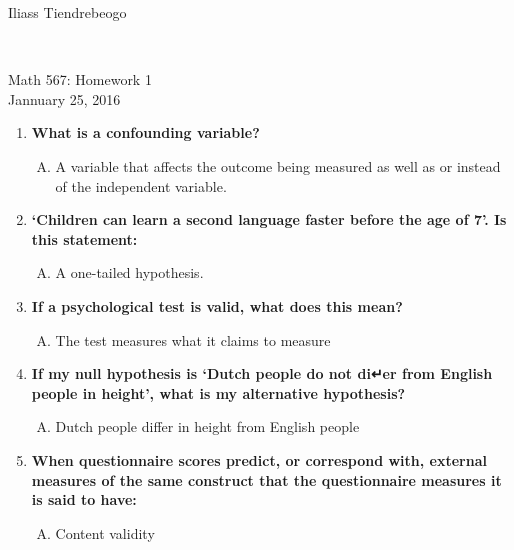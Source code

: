 \documentclass{article}[14pt]
\begin{document}
\hfill Iliass Tiendrebeogo\\

\hfill \date{Jannuary 25, 2016} \\

\bigskip

\begin{center}
  \begin{Large}
    Math 567: Homework 1\\
    Jannuary 25, 2016\\
   
  \end{Large}
\end{center} 


\begin{enumerate}[1.]
\item  %
{\bf What is a confounding variable? }
 \begin{enumerate}[B.]
 \item 
A variable that affects the outcome being measured as well as or instead of the independent
variable.
\end{enumerate}
\item %
{\bf ‘Children can learn a second language faster before the age of 7’. Is this statement: }
 \begin{enumerate}[D.]
 \item 
  A one-tailed hypothesis.
\end{enumerate}

\item %
 {\bf If a psychological test is valid, what does this mean?}
 \begin{enumerate}[B.]
 \item 
  The test measures what it claims to measure
  \end{enumerate}

\item %
 {\bf If my null hypothesis is ‘Dutch people do not di↵er from English people in height’, what is my alternative
hypothesis?}
 \begin{enumerate}[C.]
 \item 

  Dutch people differ in height from English people
  \end{enumerate}
 \item %
 {\bf  When questionnaire scores predict, or correspond with, external measures of the same construct that
the questionnaire measures it is said to have:}
 \begin{enumerate}[C.]
 \item 
  Content validity
\end{enumerate}


\end{enumerate}
\end{document}
